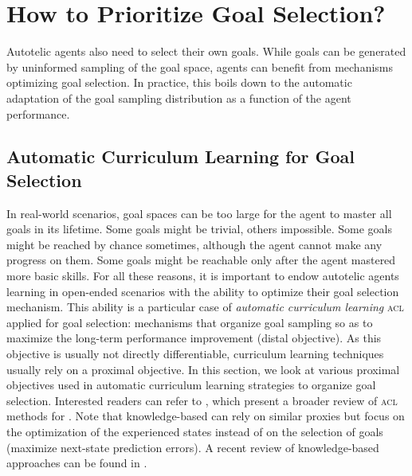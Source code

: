 \section{How to Prioritize Goal Selection?}
\label{sec:survey_generation}

Autotelic agents also need to select their own goals. While goals can be generated by uninformed sampling of the goal space, agents can benefit from mechanisms optimizing goal selection. In practice, this boils down to the automatic adaptation of the goal sampling distribution as a function of the agent performance.

\subsection{Automatic Curriculum Learning for Goal Selection}
In real-world scenarios, goal spaces can be too large for the agent to master all goals in its lifetime. Some goals might be trivial, others impossible. Some goals might be reached by chance sometimes, although the agent cannot make any progress on them. Some goals might be reachable only after the agent mastered more basic skills. For all these reasons, it is important to endow autotelic agents learning in open-ended scenarios with the ability to optimize their goal selection mechanism. This ability is a particular case of \textit{automatic curriculum learning} \textsc{acl} applied for goal selection: mechanisms that organize goal sampling so as to maximize the long-term performance improvement (distal objective). As this objective is usually not directly differentiable, curriculum learning techniques usually rely on a proximal objective. In this section, we look at various proximal objectives used in automatic curriculum learning strategies to organize goal selection. Interested readers can refer to \cite{portelas2020automatic}, which present a broader review of \textsc{acl} methods for \rl. Note that knowledge-based \ims can rely on similar proxies but focus on the optimization of the experienced states instead of on the selection of goals (\eg maximize next-state prediction errors). A recent review of knowledge-based \im approaches can be found in \cite{linke2019adapting}.


